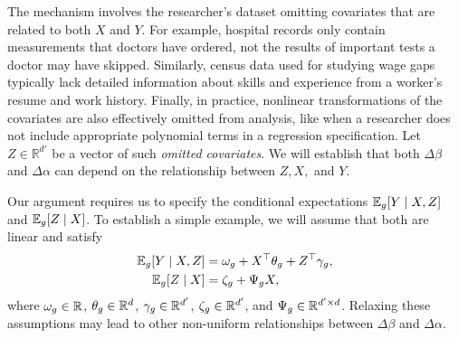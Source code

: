 The mechanism involves the researcher's dataset omitting covariates that are related to both \( X \) and \( Y \).
For example, hospital records only contain measurements that doctors have ordered, not the results of important tests a doctor may have skipped.
Similarly, census data used for studying wage gaps typically lack detailed information about skills and experience from a worker's resume and work history.
Finally, in practice, nonlinear transformations of the covariates are also effectively omitted from analysis, like when a researcher does not include appropriate polynomial terms in a regression specification.
Let \( Z \in \mathbb{R}^{d'} \) be a vector of such \textit{omitted covariates}.
We will establish that both \( \Delta \beta \) and \( \Delta \alpha \) can depend on the relationship between \( Z, X, \) and \( Y \).

Our argument requires us to specify the conditional expectations \( \mathbb{E}_g[Y \mid X, Z] \) and \( \mathbb{E}_g[Z \mid X] \).
To establish a simple example, we will assume that both are linear and satisfy
\begin{align}
  \label{eq:y_on_x_z}
  \mathbb{E}_g[Y \mid X, Z] &= \omega_g + X^\top \theta_g + Z^\top \gamma_g, \\
  \label{eq:z_on_x}
  \mathbb{E}_g[Z \mid X] &= \zeta_g + \Psi_g X,
\end{align}
where $\omega_g \in \mathbb{R}$, $\theta_g \in \mathbb{R}^d$, $\gamma_g \in \mathbb{R}^{d'}$, $\zeta_g \in \mathbb{R}^{d'}$, and $\Psi_g \in \mathbb{R}^{d' \times d}$.
Relaxing these assumptions may lead to other non-uniform relationships between \( \Delta \beta \) and \( \Delta \alpha \).

